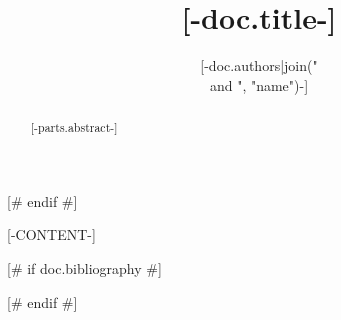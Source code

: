 \documentclass{article}
\title{[-doc.title-]}
\author{[-doc.authors|join(" \\and ", "name")-]}
\date{\displaydate{articleDate}}
\begin{document}
\begin{abstract}[-parts.abstract-]\end{abstract}[# endif #]

[-CONTENT-]


[# if doc.bibliography #]

[# endif #]
\end{document}
